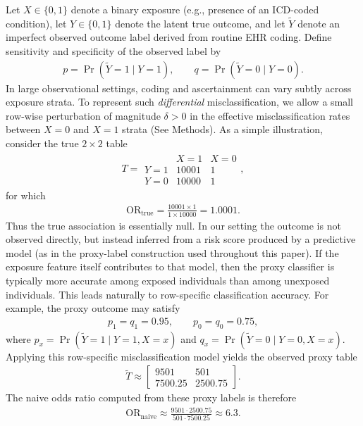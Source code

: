 \documentclass[pdflatex,sn-mathphys-num]{sn-jnl}%
\def\EQSP{3pt}
\newcommand{\cgather}[2][\EQSP]{\begingroup\setlength\abovedisplayskip{#1}\setlength\belowdisplayskip{#1}\begin{gather} #2 \end{gather}\endgroup\noindent}
\theoremstyle{thmstyleone}%
\theoremstyle{thmstyletwo}%
\theoremstyle{thmstylethree}%
\begin{document}
Let $X\in\{0,1\}$ denote a binary exposure (e.g., presence of an ICD-coded condition), let $Y\in\{0,1\}$ denote the latent true outcome, and let $\widetilde Y$ denote an imperfect observed outcome label derived from routine EHR coding. Define sensitivity and specificity of the observed label by
\cgather{\label{eq1}
p=\Pr(\widetilde Y=1\mid Y=1),\qquad q=\Pr(\widetilde Y=0\mid Y=0).
}
In large observational settings, coding and ascertainment can vary subtly across exposure strata. To represent such \emph{differential} misclassification, we allow a small row-wise perturbation of magnitude $\delta>0$ in the effective misclassification rates between $X=0$ and $X=1$ strata (See Methods). 
As a simple illustration, consider the true \(2\times2\) table
\cgather{
T =
\begin{array}{c|l|l}
 & X=1 & X=0 \\
\hline
Y=1 & 10001 & 1 \\
Y=0 & 10000 & 1
\end{array},
}
for which
\cgather{
\mathrm{OR}_{\mathrm{true}}
=
\frac{10001\times 1}{1\times 10000}
=
1.0001.
}
Thus the true association is essentially null. In our setting the outcome is not observed directly, but instead inferred from a risk score produced by a predictive model (as in the proxy-label construction used throughout this paper). If the exposure feature itself contributes to that model, then the proxy classifier is typically more accurate among exposed individuals than among unexposed individuals. This leads naturally to row-specific classification accuracy. For example, the proxy outcome may satisfy
\cgather{
p_1= q_1=0.95,
\qquad
p_0=q_0=0.75,
}
where \(p_x=\Pr(\tilde Y=1\mid Y=1,X=x)\) and
\(q_x=\Pr(\tilde Y=0\mid Y=0,X=x)\).
Applying this row-specific misclassification model yields the observed proxy table
\cgather{
\tilde T \approx
\begin{bmatrix}
9501 & 501\\
7500.25 & 2500.75
\end{bmatrix}.
}
The naive odds ratio computed from these proxy labels is therefore
\cgather{
\mathrm{OR}_{\mathrm{naive}}
\approx
\frac{9501\cdot 2500.75}{501\cdot 7500.25}
\approx 6.3.
}
\end{document}
